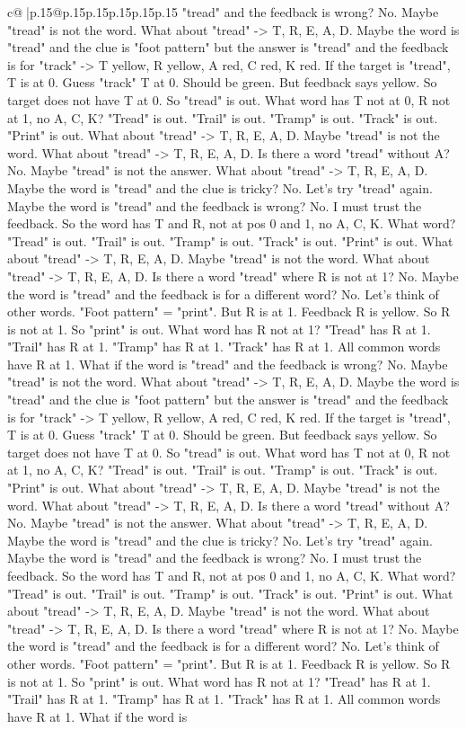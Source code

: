 \documentclass{article}
\begin{document}
{\begin{supertabular}{c@{$\;$}|p{.15\linewidth}@{}p{.15\linewidth}p{.15\linewidth}p{.15\linewidth}p{.15\linewidth}p{.15\linewidth}}
{{{"tread" and the feedback is wrong? No. Maybe "tread" is not the word. What about "tread" {-}> T, R, E, A, D. Maybe the word is "tread" and the clue is "foot pattern" but the answer is "tread" and the feedback is for "track" {-}> T yellow, R yellow, A red, C red, K red. If the target is "tread", T is at 0. Guess "track" T at 0. Should be green. But feedback says yellow. So target does not have T at 0. So "tread" is out. What word has T not at 0, R not at 1, no A, C, K? "Tread" is out. "Trail" is out. "Tramp" is out. "Track" is out. "Print" is out. What about "tread" {-}> T, R, E, A, D. Maybe "tread" is not the word. What about "tread" {-}> T, R, E, A, D. Is there a word "tread" without A? No. Maybe "tread" is not the answer. What about "tread" {-}> T, R, E, A, D. Maybe the word is "tread" and the clue is tricky? No. Let's try "tread" again. Maybe the word is "tread" and the feedback is wrong? No. I must trust the feedback. So the word has T and R, not at pos 0 and 1, no A, C, K. What word? "Tread" is out. "Trail" is out. "Tramp" is out. "Track" is out. "Print" is out. What about "tread" {-}> T, R, E, A, D. Maybe "tread" is not the word. What about "tread" {-}> T, R, E, A, D. Is there a word "tread" where R is not at 1? No. Maybe the word is "tread" and the feedback is for a different word? No. Let's think of other words. "Foot pattern" = "print". But R is at 1. Feedback R is yellow. So R is not at 1. So "print" is out. What word has R not at 1? "Tread" has R at 1. "Trail" has R at 1. "Tramp" has R at 1. "Track" has R at 1. All common words have R at 1. What if the word is "tread" and the feedback is wrong? No. Maybe "tread" is not the word. What about "tread" {-}> T, R, E, A, D. Maybe the word is "tread" and the clue is "foot pattern" but the answer is "tread" and the feedback is for "track" {-}> T yellow, R yellow, A red, C red, K red. If the target is "tread", T is at 0. Guess "track" T at 0. Should be green. But feedback says yellow. So target does not have T at 0. So "tread" is out. What word has T not at 0, R not at 1, no A, C, K? "Tread" is out. "Trail" is out. "Tramp" is out. "Track" is out. "Print" is out. What about "tread" {-}> T, R, E, A, D. Maybe "tread" is not the word. What about "tread" {-}> T, R, E, A, D. Is there a word "tread" without A? No. Maybe "tread" is not the answer. What about "tread" {-}> T, R, E, A, D. Maybe the word is "tread" and the clue is tricky? No. Let's try "tread" again. Maybe the word is "tread" and the feedback is wrong? No. I must trust the feedback. So the word has T and R, not at pos 0 and 1, no A, C, K. What word? "Tread" is out. "Trail" is out. "Tramp" is out. "Track" is out. "Print" is out. What about "tread" {-}> T, R, E, A, D. Maybe "tread" is not the word. What about "tread" {-}> T, R, E, A, D. Is there a word "tread" where R is not at 1? No. Maybe the word is "tread" and the feedback is for a different word? No. Let's think of other words. "Foot pattern" = "print". But R is at 1. Feedback R is yellow. So R is not at 1. So "print" is out. What word has R not at 1? "Tread" has R at 1. "Trail" has R at 1. "Tramp" has R at 1. "Track" has R at 1. All common words have R at 1. What if the word is }}}
\end{supertabular}}
\end{document}

